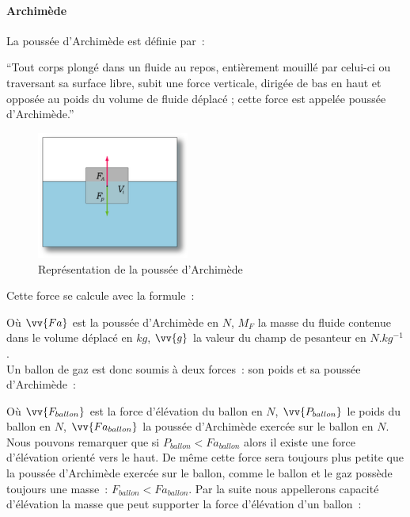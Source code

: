 \documentclass[a4paper,11pt]{article}
\begin{document}
\paragraph{Archimède}

La poussée d'Archimède est définie par~:

\enquote{Tout corps plongé dans un fluide au repos, entièrement mouillé par celui-ci ou traversant sa surface libre, subit une force verticale, dirigée de bas en haut et opposée au poids du volume de fluide déplacé ; cette force est appelée poussée d'Archimède.}

\begin{figure}[H]
	\centering
	\includegraphics[width=5cm]{../Images/pousse_archimede.png}
	\caption{Représentation de la poussée d'Archimède}
\end{figure}

Cette force se calcule avec la formule~:

\begin{center}
\end{center}

Où $\vv{Fa}$ est la poussée d'Archimède en $N$, $M_F$ la masse du fluide contenue dans le volume déplacé en $kg$, $\vv{g}$ la valeur du champ de pesanteur en $N.kg^{-1}$. \\

Un ballon de gaz est donc soumis à deux forces~: son poids et sa poussée d'Archimède~:

\begin{center}
\end{center}

Où $\vv{F_{ballon}}$ est la force d'élévation du ballon en $N$, $\vv{P_{ballon}}$ le poids du ballon en $N$, $\vv{Fa_{ballon}}$ la poussée d'Archimède exercée sur le ballon en $N$. \\

Nous pouvons remarquer que si $P_{ballon} < Fa_{ballon}$ alors il existe une force d'élévation orienté vers le haut. De même cette force sera toujours  plus petite que la poussée d'Archimède exercée sur le ballon, comme le ballon et le gaz possède toujours une masse~: $F_{ballon} < Fa_{ballon}$.
Par la suite nous appellerons capacité d'élévation la masse que peut supporter la force d'élévation d'un ballon~:
\begin{center}
\end{center}
\end{document}
